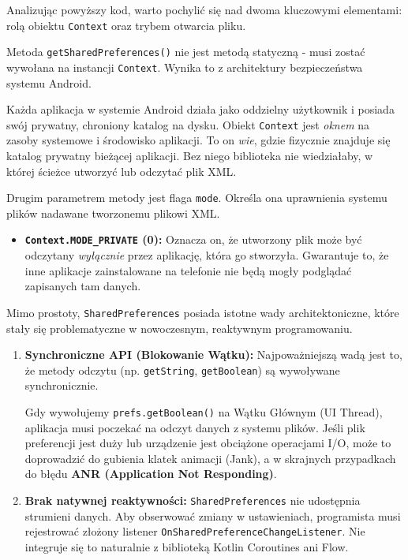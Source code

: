 Analizując powyższy kod, warto pochylić się nad dwoma kluczowymi elementami: rolą obiektu \texttt{Context} oraz trybem otwarcia pliku.

Metoda \texttt{getSharedPreferences()} nie jest metodą statyczną - musi zostać wywołana na instancji \texttt{Context}. Wynika to z architektury bezpieczeństwa systemu Android.

Każda aplikacja w systemie Android działa jako oddzielny użytkownik i posiada swój prywatny, chroniony katalog na dysku.
Obiekt \texttt{Context} jest \textit{oknem} na zasoby systemowe i środowisko aplikacji. To on \textit{wie}, gdzie fizycznie znajduje się katalog prywatny bieżącej aplikacji. Bez niego biblioteka nie wiedziałaby, w której ścieżce utworzyć lub odczytać plik XML.

Drugim parametrem metody jest flaga \texttt{mode}. Określa ona uprawnienia systemu plików nadawane tworzonemu plikowi XML.

\begin{itemize}
    \item \textbf{\texttt{Context.MODE\_PRIVATE} (0):} Oznacza on, że utworzony plik może być odczytany \textit{wyłącznie} przez aplikację, która go stworzyła. Gwarantuje to, że inne aplikacje zainstalowane na telefonie nie będą mogły podglądać zapisanych tam danych.
\end{itemize}

Mimo prostoty, \texttt{SharedPreferences} posiada istotne wady architektoniczne, które stały się problematyczne w nowoczesnym, reaktywnym programowaniu.

\begin{enumerate}
    \item \textbf{Synchroniczne API (Blokowanie Wątku):} Najpoważniejszą wadą jest to, że metody odczytu (np. \texttt{getString}, \texttt{getBoolean}) są wywoływane synchronicznie.

    Gdy wywołujemy \texttt{prefs.getBoolean()} na Wątku Głównym (UI Thread), aplikacja musi poczekać na odczyt danych z systemu plików. Jeśli plik preferencji jest duży lub urządzenie jest obciążone operacjami I/O, może to doprowadzić do gubienia klatek animacji (Jank), a w skrajnych przypadkach do błędu \textbf{ANR (Application Not Responding)}.

    \item \textbf{Brak natywnej reaktywności:} \texttt{SharedPreferences} nie udostępnia strumieni danych. Aby obserwować zmiany w ustawieniach, programista musi rejestrować złożony listener \texttt{OnSharedPreferenceChangeListener}. Nie integruje się to naturalnie z biblioteką Kotlin Coroutines ani Flow.
\end{enumerate}

